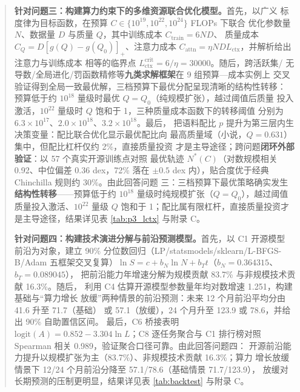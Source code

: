 \documentclass[bwprint]{gmcmthesis}
\begin{document}
\begin{abstract}
\textbf{针对问题三：构建算力约束下的多维资源联合优化模型。}首先，以广义
标度律为目标函数，在预算 $C\in\{10^{19},10^{22},10^{24}\}$ FLOPs 下联合
优化参数量 $N$、数据量 $D$ 与质量 $Q$，其中训练成本 $C_{\text{train}}=6ND$、
质量成本 $C_{Q}=D[g(Q)-g(Q_0)]_{+}$、注意力成本
$C_{\text{attn}}=\eta N D L_{\text{ctx}}$，并解析给出注意力与训练成本
相等的临界点 $L_{\text{ctx}}^{\text{crit}}=6/\eta=30000$。随后，跨活跃集/
无导数/全局进化/罚函数精修等\textbf{九类求解框架}在 9 组预算—成本实例上
交叉验证得到全局一致最优解，三档预算下最优分配呈现清晰的结构性转移：
预算低于约 $10^{18}$ 量级时最优 $Q=Q_0$（纯规模扩张），越过阈值后质量
投入激活，$10^{22}$ 量级时 $Q$ 饱和于 1，三种质量成本函数下的转移阈值
分别为 $6.3\times10^{17}$、$2.0\times10^{18}$、$3.2\times10^{18}$。最后，
把语料配比 $p$ 提升为第三层内生决策变量：配比联合优化显示最优配比向
最高质量域（小说，$Q=0.631$）集中，但配比杠杆仅约 2\%，直接质量投资
才是主导途径；跨问题\textbf{闭环外部验证}：以 57 个真实开源训练点对照
最优轨迹 $N^{*}(C)$（对数规模相关 0.92、中位偏差 0.36 dex，72\% 落在
$\pm0.5$ dex 内），贴合度优于经典 Chinchilla 规则约 30\%。由此回答问题
三：三档预算下最优策略确实发生\textbf{结构性转移}——预算低于约 $10^{18}$
量级时纯规模扩张（$Q=Q_0$），越过阈值质量投入激活、$10^{22}$ 量级
$Q$ 饱和于 1；配比属有限杠杆，直接质量投资才是主导途径，结果详见表
\ref{tab:p3_lctx} 与附录 C。

\textbf{针对问题四：构建技术演进分解与前沿预测模型。}首先，以 C1 开源模型
前沿为对象，建立 90\% 分位数回归（LP/statsmodels/sklearn/L-BFGS-B/Adam
五框架交叉复算）$\ln S=c+b_N\ln N+b_T t$（$b_N=0.364315$、$b_T=0.089045$），
把前沿能力年增速分解为规模贡献 83.7\% 与非规模技术贡献 16.3\%。随后，
利用 C4 估算开源模型参数量年均对数增速 1.251，构建基础与``算力增长
放缓''两种情景的前沿预测：未来 12 个月前沿平均分由 41.6 升至 71.7（基础）
或 57.1（放缓），24 个月升至 123.9 或 78.6，并给出 90\% 自助置信区间。
最后，C6 桥接表明 $\text{logit}(A)=0.852-3.304\ln L$；C8 逐任务聚合与
C1 排行榜对照 Spearman 相关 0.989，验证聚合口径可靠。由此回答问题四：
开源前沿能力提升以规模扩张为主（83.7\%）、非规模技术贡献 16.3\%；算力
增长放缓情景下 12/24 个月前沿分降至 57.1/78.6（基础情景 71.7/123.9），
放缓对长期预测的压制更明显，结果详见表 \ref{tab:backtest} 与附录 C。


\end{abstract}
\end{document}
